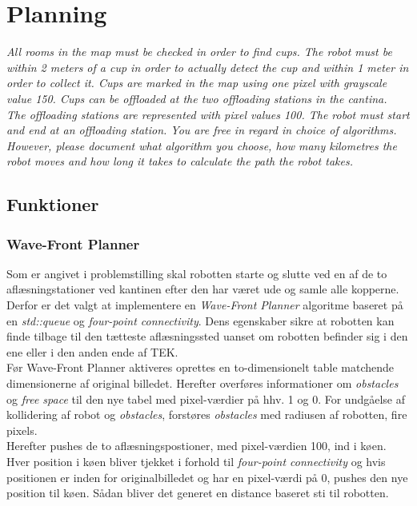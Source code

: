 \section{Planning}
\label{sec:plan}
\textit{All rooms in the map must be checked in order to find cups. The robot must be within 2 meters of a cup in order to actually detect the cup and within 1 meter in order to collect it. Cups are marked in the map using one pixel with grayscale value 150. Cups can be offloaded at the two offloading stations in the cantina. The offloading stations are represented with pixel values 100. The robot must start and end at an offloading station.
You are free in regard in choice of algorithms. However, please document what algorithm you choose, how many kilometres the robot moves and how long it takes to calculate the path the robot takes.}

\subsection{Funktioner}

\subsubsection{Wave-Front Planner}
Som er angivet i problemstilling skal robotten starte og slutte ved en af de to aflæsningstationer ved kantinen efter den har været ude og samle alle kopperne. Derfor er det valgt at implementere en \emph{Wave-Front Planner} algoritme baseret på en \emph{std::queue} og \emph{four-point connectivity}. 
Dens egenskaber sikre at robotten kan finde tilbage til den tætteste aflæsningssted uanset om robotten befinder sig i den ene eller i den anden ende af TEK. \\

Før Wave-Front Planner aktiveres oprettes en to-dimensionelt table matchende dimensionerne af original billedet. Herefter overføres informationer om \emph{obstacles} og \emph{free space} til den nye tabel med pixel-værdier på hhv. 1 og 0. For undgåelse af kollidering af robot og \emph{obstacles}, forstøres \emph{obstacles} med radiusen af robotten, fire pixels.\\
Herefter pushes de to aflæsningspostioner, med pixel-værdien 100, ind i køen. \\

Hver position i køen bliver tjekket i forhold til \emph{four-point connectivity} og hvis positionen er inden for originalbilledet og har en pixel-værdi på 0, pushes den nye position til køen. Sådan bliver det generet en distance baseret sti til robotten.\\

